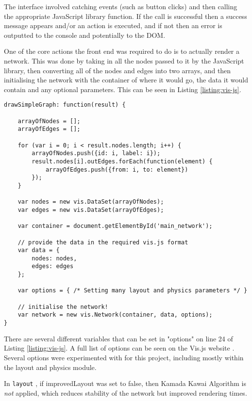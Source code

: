 \documentclass[../dissertation.tex]{subfiles}
\begin{document}
The interface involved catching events (such as button clicks) and then calling the appropriate JavaScript library function. If the call is successful then a success message appears and/or an action is executed, and if not then an error is outputted to the console and potentially to the DOM. 

One of the core actions the front end was required to do is to actually render a network. This was done by taking in all the nodes passed to it by the JavaScript library, then converting all of the nodes and edges into two arrays, and then initialising the network with the container of where it would go, the data it would contain and any optional parameters. This can be seen in Listing \ref{listing:vis-js}.

\begin{lstlisting}[caption=How to create a network using Vis.js, label=listing:vis-js]
drawSimpleGraph: function(result) {

    arrayOfNodes = [];
    arrayOfEdges = [];
    
    for (var i = 0; i < result.nodes.length; i++) {
        arrayOfNodes.push({id: i, label: i});
        result.nodes[i].outEdges.forEach(function(element) {
            arrayOfEdges.push({from: i, to: element})
        });
    }
    
    var nodes = new vis.DataSet(arrayOfNodes);
    var edges = new vis.DataSet(arrayOfEdges);
    
    var container = document.getElementById('main_network');
    
    // provide the data in the required vis.js format
    var data = {
        nodes: nodes,
        edges: edges
    };
    
    var options = { /* Setting many layout and physics parameters */ }
    
    // initialise the network!
    var network = new vis.Network(container, data, options);
}
\end{lstlisting}

There are several different variables that can be set in "options" on line 24 of Listing \ref{listing:vis-js}. A full list of options can be seen on the Vis.js website \cite{visjsoptions}. Several options were experimented with for this project, including mostly within the layout and physics module. 


In \texttt{layout} \cite{visjslayout}, if improvedLayout was set to false, then Kamada Kawai Algorithm \cite{kamada1989algorithm} is \emph{not} applied, which reduces stability of the network but improved rendering times. 
\end{document}
